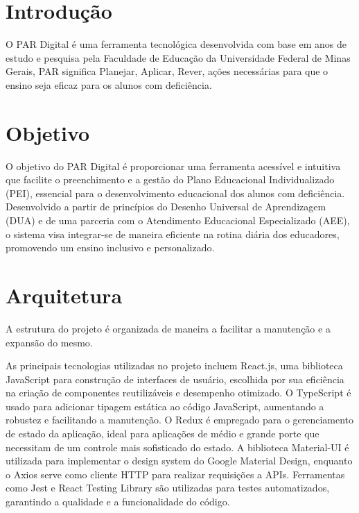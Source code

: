 \documentclass[sigconf]{webmedia}
\begin{document}
\maketitle

\section{Introdução}

O PAR Digital é uma ferramenta tecnológica desenvolvida com base em anos de estudo
e pesquisa pela Faculdade de Educação da Universidade Federal de Minas Gerais, PAR
significa Planejar, Aplicar, Rever, ações necessárias para que o ensino seja eficaz
para os alunos com deficiência.

\section{Objetivo}
O objetivo do PAR Digital é proporcionar uma ferramenta acessível e intuitiva
que facilite o preenchimento e a gestão do Plano Educacional Individualizado (PEI),
essencial para o desenvolvimento educacional dos alunos com deficiência. Desenvolvido
 a partir de princípios do Desenho Universal de Aprendizagem (DUA) e de uma parceria
 com o Atendimento Educacional Especializado (AEE), o sistema visa integrar-se de
 maneira eficiente na rotina diária dos educadores, promovendo um ensino inclusivo
 e personalizado.

\section{Arquitetura}

A estrutura do projeto é organizada de maneira a facilitar 
a manutenção e a expansão do mesmo.

As principais tecnologias utilizadas no projeto incluem React.js, uma biblioteca
JavaScript para construção de interfaces de usuário, escolhida por sua eficiência
na criação de componentes reutilizáveis e desempenho otimizado. O TypeScript é
usado para adicionar tipagem estática ao código JavaScript, aumentando a robustez
e facilitando a manutenção. O Redux é empregado para o gerenciamento de estado da
aplicação, ideal para aplicações de médio e grande porte que necessitam de um
controle mais sofisticado do estado. A biblioteca Material-UI é utilizada para
implementar o design system do Google Material Design, enquanto o Axios serve
como cliente HTTP para realizar requisições a APIs. Ferramentas como Jest e
React Testing Library são utilizadas para testes automatizados, garantindo a
qualidade e a funcionalidade do código.
\end{document}
